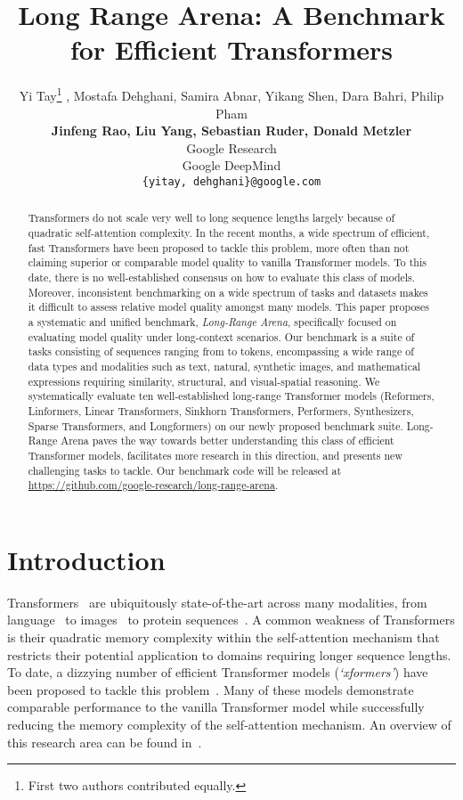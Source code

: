 \documentclass{article} \usepackage{iclr2021_conference,times}
\title{Long Range Arena: A Benchmark for Efficient Transformers}
\author{Yi Tay\thanks{First two authors contributed equally.} , Mostafa Dehghani, Samira Abnar,  Yikang Shen, Dara Bahri, Philip Pham \\ \textbf{Jinfeng Rao, Liu Yang, Sebastian Ruder, Donald Metzler} \\
Google Research \\
Google DeepMind \\
\texttt{\{yitay, dehghani\}@google.com}


}
\newcommand{\lra}{Long-Range Arena\xspace}
\begin{document}
\maketitle

\begin{abstract}
Transformers do not scale very well to long sequence lengths largely because of quadratic self-attention complexity. In the recent months, a wide spectrum of efficient, fast Transformers have been proposed to tackle this problem, more often than not claiming superior or comparable model quality to vanilla Transformer models. To this date, there is no well-established consensus on how to evaluate this class of models. Moreover, inconsistent benchmarking on a wide spectrum of tasks and datasets makes it difficult to assess relative model quality amongst many models. This paper proposes a systematic and unified benchmark, \emph{\lra}, specifically focused on evaluating model quality under long-context scenarios. Our benchmark is a suite of tasks consisting of sequences ranging from  to  tokens, encompassing a wide range of data types and modalities such as text, natural, synthetic images, and mathematical expressions requiring similarity, structural, and visual-spatial reasoning. We systematically evaluate ten well-established long-range Transformer models (Reformers, Linformers, Linear Transformers, Sinkhorn Transformers, Performers, Synthesizers, Sparse Transformers, and Longformers) on our newly proposed benchmark suite. \lra paves the way towards better understanding this class of efficient Transformer models, facilitates more research in this direction, and presents new challenging tasks to tackle. Our benchmark code will be released at \url{https://github.com/google-research/long-range-arena}.
\end{abstract}


\section{Introduction}
Transformers~\citep{vaswani2017attention} are ubiquitously state-of-the-art across many modalities, from language~\citep{devlin2018bert,raffel2019exploring,child2019generating} to images~\citep{Tan2019lxmert,lu2019vilbert} to protein sequences~\citep{rives2019biological}. A common weakness of Transformers is their quadratic memory complexity within the self-attention mechanism that restricts their potential application to domains requiring longer sequence lengths. To date, a dizzying number of efficient Transformer models (\textit{`xformers'}) have been proposed to tackle this problem~\citep{liu2018generating,kitaev2020reformer,wang2020linformer,tay2020sparse,katharopoulos2020transformers}. Many of these models demonstrate comparable performance to the vanilla Transformer model while successfully reducing the memory complexity of the self-attention mechanism. An overview of this research area can be found in~\citep{tay2020efficient}.
\end{document}
